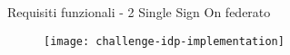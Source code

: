 \begin{tframe}{Requisiti funzionali - 2 \newline \mbox{} \hfill Single Sign On federato}
\begin{figure}[h]
\centering
\texttt{[image: challenge-idp-implementation]}
\end{figure}
\end{tframe}